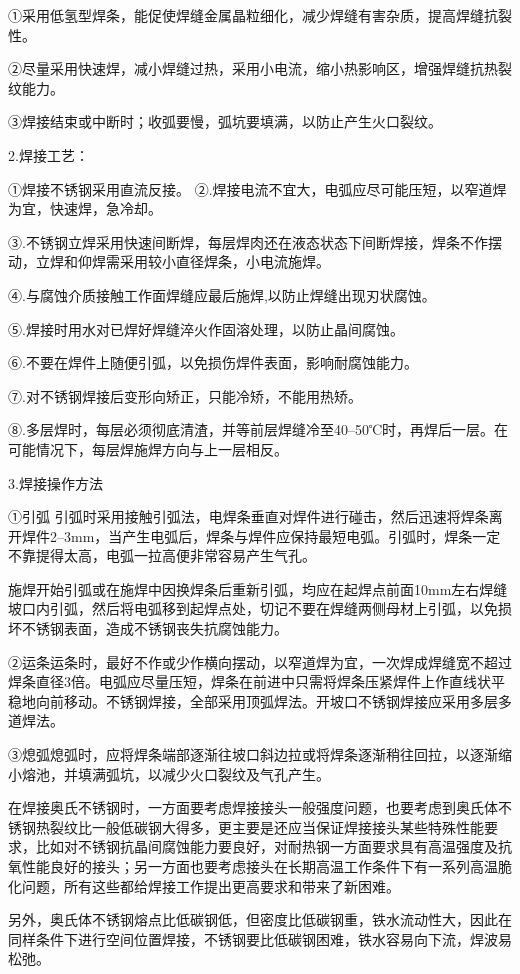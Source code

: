 \documentclass{ctexbook}
\begin{document}
①采用低氢型焊条，能促使焊缝金属晶粒细化，减少焊缝有害杂质，提高焊缝抗裂性。

②尽量采用快速焊，减小焊缝过热，采用小电流，缩小热影响区，增强焊缝抗热裂纹能力。

③焊接结束或中断时；收弧要慢，弧坑要填满，以防止产生火口裂纹。

2.焊接工艺：

①焊接不锈钢采用直流反接。
②.焊接电流不宜大，电弧应尽可能压短，以窄道焊为宜，快速焊，急冷却。

③.不锈钢立焊采用快速间断焊，每层焊肉还在液态状态下间断焊接，焊条不作摆动，立焊和仰焊需采用较小直径焊条，小电流施焊。

④.与腐蚀介质接触工作面焊缝应最后施焊,以防止焊缝出现刃状腐蚀。

⑤.焊接时用水对已焊好焊缝淬火作固溶处理，以防止晶间腐蚀。

⑥.不要在焊件上随便引弧，以免损伤焊件表面，影响耐腐蚀能力。

⑦.对不锈钢焊接后变形向矫正，只能冷矫，不能用热矫。

⑧.多层焊时，每层必须彻底清渣，并等前层焊缝冷至40--50℃时，再焊后一层。在可能情况下，每层焊施焊方向与上一层相反。

3.焊接操作方法

①引弧 引弧时采用接触引弧法，电焊条垂直对焊件进行碰击，然后迅速将焊条离开焊件2--3mm，当产生电弧后，焊条与焊件应保持最短电弧。引弧时，焊条一定不靠提得太高，电弧一拉高便非常容易产生气孔。

施焊开始引弧或在施焊中因换焊条后重新引弧，均应在起焊点前面10mm左右焊缝坡口内引弧，然后将电弧移到起焊点处，切记不要在焊缝两侧母材上引弧，以免损坏不锈钢表面，造成不锈钢丧失抗腐蚀能力。

②运条运条时，最好不作或少作横向摆动，以窄道焊为宜，一次焊成焊缝宽不超过焊条直径3倍。电弧应尽量压短，焊条在前进中只需将焊条压紧焊件上作直线状平稳地向前移动。不锈钢焊接，全部采用顶弧焊法。开坡口不锈钢焊接应采用多层多道焊法。

③熄弧熄弧时，应将焊条端部逐渐往坡口斜边拉或将焊条逐渐稍往回拉，以逐渐缩小熔池，并填满弧坑，以减少火口裂纹及气孔产生。

在焊接奥氏不锈钢时，一方面要考虑焊接接头一般强度问题，也要考虑到奥氏体不锈钢热裂纹比一般低碳钢大得多，更主要是还应当保证焊接接头某些特殊性能要求，比如对不锈钢抗晶间腐蚀能力要良好，对耐热钢一方面要求具有高温强度及抗氧性能良好的接头；另一方面也要考虑接头在长期高温工作条件下有一系列高温脆化问题，所有这些都给焊接工作提出更高要求和带来了新困难。

另外，奥氏体不锈钢熔点比低碳钢低，但密度比低碳钢重，铁水流动性大，因此在同样条件下进行空间位置焊接，不锈钢要比低碳钢困难，铁水容易向下流，焊波易松弛。
\end{document}
